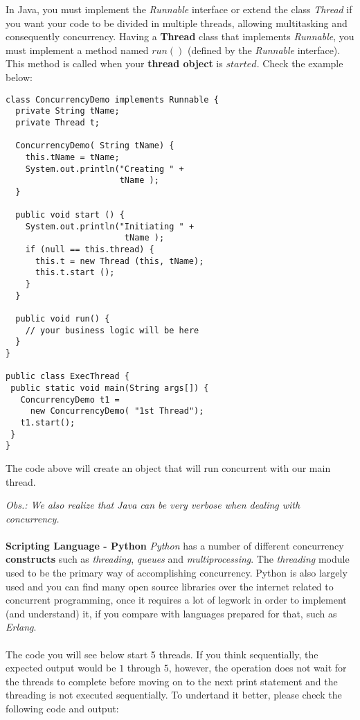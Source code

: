 \documentclass[conference]{IEEEtran}
\begin{document}
In Java, you must implement the \textit{Runnable} interface or extend the class \textit{Thread} if you want your code to be divided in multiple threads, allowing multitasking and consequently concurrency. Having a \textbf{Thread} class that implements \textit{Runnable}, you must implement a method named $run()$ (defined by the \textit{Runnable} interface). This method is called when your \textbf{thread object} is $started$. Check the example below:

\lstset{language=java}
\begin{lstlisting}[frame=single]
class ConcurrencyDemo implements Runnable {
  private String tName;
  private Thread t;
   
  ConcurrencyDemo( String tName) {
    this.tName = tName;
    System.out.println("Creating " + 
                       tName );
  }
  
  public void start () {
    System.out.println("Initiating " +
                        tName );
    if (null == this.thread) {
      this.t = new Thread (this, tName);
      this.t.start ();
    }
  }  
   
  public void run() {
    // your business logic will be here
  }
}

public class ExecThread {
 public static void main(String args[]) {
   ConcurrencyDemo t1 =
     new ConcurrencyDemo( "1st Thread");
   t1.start();
 }   
}
\end{lstlisting}

The code above will create an object that will run concurrent with our main thread.

\textit{ Obs.: We also realize that Java can be very verbose when dealing with concurrency. }
\\\\
\textbf{ Scripting Language - Python }
\textit{Python} has a number of different concurrency \textbf{constructs} such as \textit{threading}, \textit{queues} and \textit{multiprocessing}. The \textit{threading} module used to be the primary way of accomplishing concurrency. Python is also largely used and you can find many open source libraries over the internet related to concurrent programming, once it requires a lot of legwork in order to implement (and understand) it, if you compare with languages prepared for that, such as \textit{Erlang}.
\\\\
The code you will see below start 5 threads. If you think sequentially, the expected output would be $1$ through $5$, however, the operation does not wait for the threads to complete before moving on to the next print statement and the threading is not executed sequentially. To undertand it better, please check the following code and output:
\end{document}
